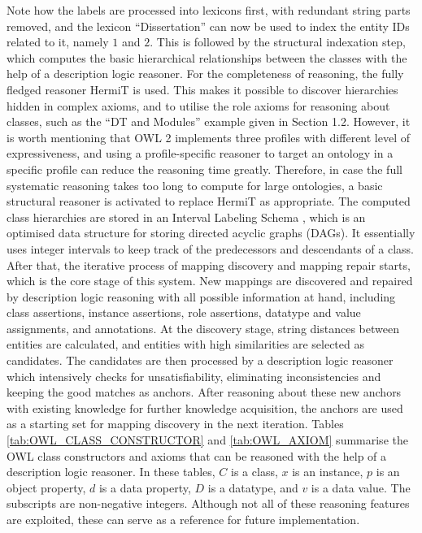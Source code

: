 Note how the labels are processed into lexicons first, with redundant string parts removed, and the lexicon ``Dissertation'' can now be used to index the entity IDs related to it, namely $1$ and $2$. This is followed by the structural indexation step, which computes the basic hierarchical relationships between the classes with the help of a description logic reasoner. For the completeness of reasoning, the fully fledged reasoner HermiT is used. This makes it possible to discover hierarchies hidden in complex axioms, and to utilise the role axioms for reasoning about classes, such as the ``DT and Modules'' example given in Section 1.2. However, it is worth mentioning that OWL 2 implements three profiles with different level of expressiveness, and using a profile-specific reasoner to target an ontology in a specific profile can reduce the reasoning time greatly. Therefore, in case the full systematic reasoning takes too long to compute for large ontologies, a basic structural reasoner is activated to replace HermiT as appropriate. The computed class hierarchies are stored in an Interval Labeling Schema \cite{DBLP:conf/semweb/Jimenez-RuizG11}, which is an optimised data structure for storing directed acyclic graphs (DAGs). It essentially uses integer intervals to keep track of the predecessors and descendants of a class. After that, the iterative process of mapping discovery and mapping repair starts, which is the core stage of this system. New mappings are discovered and repaired by description logic reasoning with all possible information at hand, including class assertions, instance assertions, role assertions, datatype and value assignments, and annotations. At the discovery stage, string distances between entities are calculated, and entities with high similarities are selected as candidates. The candidates are then processed by a description logic reasoner which intensively checks for unsatisfiability, eliminating inconsistencies and keeping the good matches as anchors. After reasoning about these new anchors with existing knowledge for further knowledge acquisition, the anchors are used as a starting set for mapping discovery in the next iteration. Tables \ref{tab:OWL_CLASS_CONSTRUCTOR} and \ref{tab:OWL_AXIOM} summarise the OWL class constructors and axioms that can be reasoned with the help of a description logic reasoner. In these tables, $C$ is a class, $x$ is an instance, $p$ is an object property, $d$ is a data property, $D$ is a datatype, and $v$ is a data value. The subscripts are non-negative integers. Although not all of these reasoning features are exploited, these can serve as a reference for future implementation.

